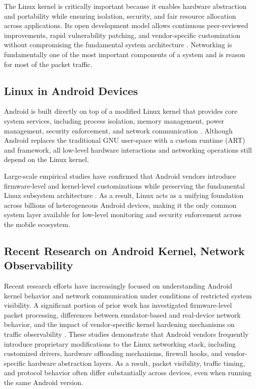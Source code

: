\documentclass{mnitjaipur}
\begin{document}
\noindent
The Linux kernel is critically important because it enables hardware abstraction and portability while ensuring isolation, security, and fair resource allocation across applications. Its open development model allows continuous peer-reviewed improvements, rapid vulnerability patching, and vendor-specific customization without compromising the fundamental system architecture \cite{linuxdoc2024}. Networking is fundamentally one of the most important components of a system and is reason for most of the packet traffic.

\subsection{Linux in Android Devices}

Android is built directly on top of a modified Linux kernel that provides core system services, including process isolation, memory management, power management, security enforcement, and network communication \cite{androidkernel2020}. Although Android replaces the traditional GNU user-space with a custom runtime (ART) and framework, all low-level hardware interactions and networking operations still depend on the Linux kernel. 

\noindent
Large-scale empirical studies have confirmed that Android vendors introduce firmware-level and kernel-level customizations while preserving the fundamental Linux subsystem architecture \cite{hou2022_firmware,possemato2021_trustbutverify}. As a result, Linux acts as a unifying foundation across billions of heterogeneous Android devices, making it the only common system layer available for low-level monitoring and security enforcement across the mobile ecosystem.

\subsection{Recent Research on Android Kernel, Network Observability}

Recent research efforts have increasingly focused on understanding Android kernel behavior and network communication under conditions of restricted system visibility. A significant portion of prior work has investigated firmware-level packet processing, differences between emulator-based and real-device network behavior, and the impact of vendor-specific kernel hardening mechanisms on traffic observability \cite{android_network_analysis, android_kernel_security, android_tcpip_stack}. These studies demonstrate that Android vendors frequently introduce proprietary modifications to the Linux networking stack, including customized drivers, hardware offloading mechanisms, firewall hooks, and vendor-specific hardware abstraction layers. As a result, packet visibility, traffic timing, and protocol behavior often differ substantially across devices, even when running the same Android version.
\end{document}
